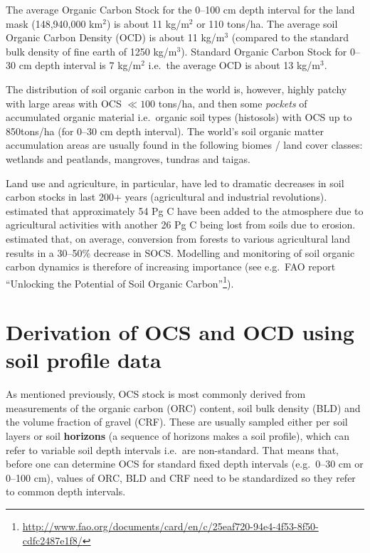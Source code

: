 \documentclass[graybox,natbib,nospthms,UStrade]{svmono}
\renewcommand{\href}[2]{#2 (\url{#1})}
\renewcommand{\href}[2]{#2\footnote{\url{#1}}}
\let\BeginKnitrBlock\begin \let\EndKnitrBlock\end
\let\BeginKnitrBlock\begin \let\EndKnitrBlock\end
\begin{document}
\BeginKnitrBlock{rmdnote}
The average Organic Carbon Stock for the 0--100 cm depth interval for the land mask (148,940,000 km\(^2\)) is about 11 kg/m\(^2\) or 110 tons/ha. The average soil Organic Carbon Density (OCD) is about 11 kg/m\(^3\) (compared to the standard bulk density of fine earth of 1250 kg/m\(^3\)). Standard Organic Carbon Stock for 0--30 cm depth interval is 7 kg/m\(^2\) i.e.~the average OCD is about 13 kg/m\(^3\).
\EndKnitrBlock{rmdnote}

The distribution of soil organic carbon in the world is, however, highly patchy with large areas with OCS \(\ll 100\) tons/ha, and then some \emph{pockets} of accumulated organic material i.e.~organic soil types (histosols) with OCS up to 850tons/ha (for 0--30 cm depth interval). The world's soil organic matter accumulation areas are usually found in the following biomes / land cover classes: wetlands and peatlands, mangroves, tundras and taigas.

Land use and agriculture, in particular, have led to dramatic decreases in soil carbon stocks in last 200+ years (agricultural and industrial revolutions). \citet{Lal2004Science} estimated that approximately 54 Pg C have been added to the atmosphere due to agricultural activities with another 26 Pg C being lost from soils due to erosion. \citet{wei2014global} estimated that, on average, conversion from forests to various agricultural land results in a 30--50\% decrease in SOCS. Modelling and monitoring of soil organic carbon dynamics is therefore of increasing importance (see e.g.~FAO report \href{http://www.fao.org/documents/card/en/c/25eaf720-94e4-4f53-8f50-cdfc2487e1f8/}{``Unlocking the Potential of Soil Organic Carbon''}).

\hypertarget{derivation-of-ocs-and-ocd-using-soil-profile-data}{%
\section{Derivation of OCS and OCD using soil profile data}\label{derivation-of-ocs-and-ocd-using-soil-profile-data}}

As mentioned previously, OCS stock is most commonly derived from measurements of the organic carbon (ORC) content, soil bulk density (BLD) and the volume fraction of gravel (CRF). These are usually sampled either per soil layers or soil \textbf{horizons} (a sequence of horizons makes a soil profile), which can refer to variable soil depth intervals i.e.~are non-standard. That means that, before one can determine OCS for standard fixed depth intervals (e.g.~0--30 cm or 0--100 cm), values of ORC, BLD and CRF need to be standardized so they refer to common depth intervals.
\end{document}
